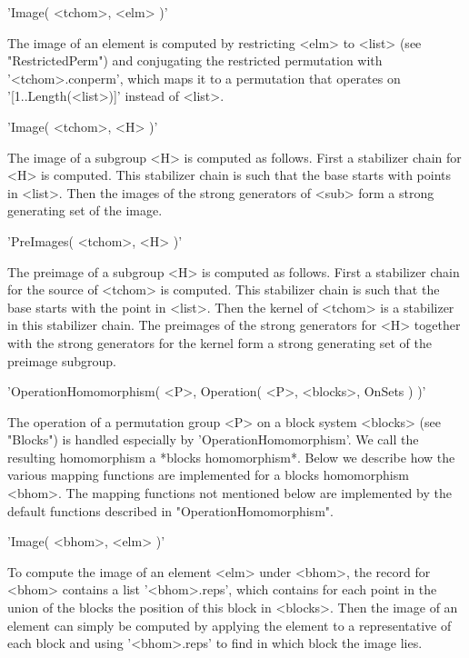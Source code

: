\vspace{5mm}
'Image( <tchom>, <elm> )'%

The image of an element is  computed  by restricting <elm> to <list> (see
"RestrictedPerm")  and   conjugating   the  restricted  permutation  with
'<tchom>.conperm',  which maps  it  to  a permutation  that  operates  on
'[1..Length(<list>)]' instead of <list>.

\vspace{5mm}
'Image( <tchom>, <H> )'

The image of a  subgroup <H> is computed as follows.  First  a stabilizer
chain for <H> is  computed.  This stabilizer  chain is such that the base
starts with points in  <list>.  Then  the images of the strong generators
of <sub> form a strong generating set of the image.

\vspace{5mm}
'PreImages( <tchom>, <H> )'%

The  preimage  of a  subgroup  <H>  is  computed  as  follows.   First  a
stabilizer chain for the  source of <tchom> is computed.  This stabilizer
chain is such that  the base starts with  the point in <list>.  Then  the
kernel  of  <tchom>  is  a  stabilizer  in  this  stabilizer  chain.  The
preimages  of  the  strong generators for  <H> together  with  the strong
generators for the  kernel form a strong generating  set  of the preimage
subgroup.

\vspace{7mm}
'OperationHomomorphism( <P>, Operation( <P>, <blocks>, OnSets ) )'%

The operation of a permutation  group <P> on a block system <blocks> (see
"Blocks") is handled especially  by 'OperationHomomorphism'.  We call the
resulting homomorphism a *blocks  homomorphism*.   Below we describe  how
the various mapping functions are implemented for a  blocks  homomorphism
<bhom>.  The mapping functions not mentioned below are implemented by the
default functions described in "OperationHomomorphism".

\vspace{5mm}
'Image( <bhom>, <elm> )'%

To compute  the  image  of  an element <elm> under <bhom>, the record for
<bhom> contains a  list '<bhom>.reps',  which  contains for each point in
the union of the blocks the position of this block in <blocks>.  Then the
image of an element can simply be computed by applying  the element  to a
representative  of each block  and  using '<bhom>.reps' to find in  which
block the image lies.

